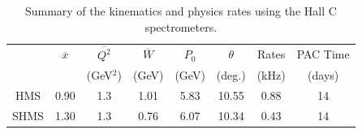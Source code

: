 
%


\begin{table}
\begin{center}
\begin{tabular}{c|c|c|c|cc|c|c}
& $\overline{x}$  & $\overline{Q^2}$    &  $\overline{W}$  	& $P_0$  &    $\theta$  &  Rates   & PAC Time   \\
&  ~     		  & (GeV$^2$)  			& (GeV) 			& (GeV)  &     (deg.)   &   (kHz)  & (days) \\
\hline\hline
HMS  & 0.90	&  1.3	&  1.01	&  5.83	&    10.55	&    0.88	&   14 \\  
SHMS & 1.30	&  1.3	&  0.76	&  6.07	&    10.34	&    0.43	&   14 \\
\hline\hline
\end{tabular}
\caption{\label{RATES1}Summary of the kinematics and physics rates using the Hall C  spectrometers.}
\end{center}
\end{table}


